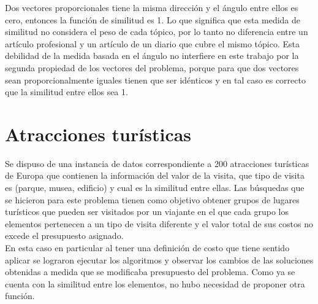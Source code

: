Dos vectores proporcionales tiene la misma dirección y el ángulo entre ellos es cero, entonces la función de similitud es 1. Lo que significa que esta medida de similitud no considera el peso de cada tópico, por lo tanto no diferencia entre un artículo profesional y un artículo de un diario que cubre el mismo tópico. Esta debilidad de la medida basada en el ángulo no interfiere en este trabajo por la segunda propiedad de los vectores del problema, porque para que dos vectores sean proporcionalmente iguales tienen que ser idénticos y en tal caso es correcto que la similitud entre ellos sea 1.
\section{Atracciones turísticas}
Se dispuso de una instancia de datos correspondiente a 200 atracciones turísticas de Europa que contienen la información del valor de la visita, que tipo de visita es (parque, musea, edificio) y cual es la similitud entre ellas. Las búsquedas que se hicieron para este problema tienen como objetivo obtener grupos de lugares turísticos que pueden ser visitados por un viajante en el que cada grupo los elementos pertenecen a un tipo de visita diferente y el valor total de sus costos no excede el presupuesto asignado.\\
En esta caso en particular al tener una definición de costo que tiene sentido aplicar se lograron ejecutar los algoritmos y observar los cambios de las soluciones obtenidas a medida que se modificaba presupuesto del problema. Como ya se cuenta con la similitud entre los elementos, no hubo necesidad de proponer otra función.